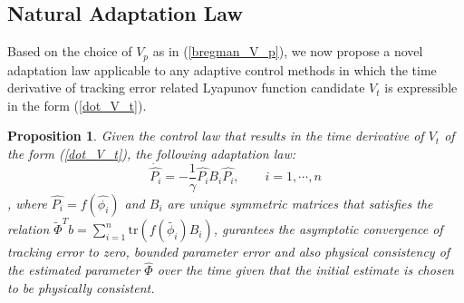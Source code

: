 \documentclass[letterpaper, 10 pt, conference]{ieeeconf}  %
\newtheorem{proposition}{Proposition}
\begin{document}
\subsection{Natural Adaptation Law}
Based on the choice of $V_{p}$ as in (\ref{bregman_V_p}), we now propose a novel adaptation law applicable to any adaptive control methods in which the time derivative of tracking error related Lyapunov function candidate $V_{t}$ is expressible in the form (\ref{dot_V_t}).
\begin{proposition}
Given the control law that results in the time derivative of $V_{t}$ of the form (\ref{dot_V_t}), the following adaptation law:
\begin{equation}
\dot{\hat{P_i}} = -\frac{1}{\gamma}\hat{P_i} B_i \hat{P_i}, \qquad i = 1, \cdots, n \label{natural_adaptation_1}
\end{equation}
, where $\hat{P_i} = f(\hat{\phi_i})$ and $B_i$ are unique symmetric matrices that satisfies the relation $\tilde{\Phi}^{T}b = \sum_{i=1}^n \mathrm{tr}(f(\tilde{\phi_i})B_i)$, gurantees the asymptotic convergence of tracking error to zero, bounded parameter error and also physical consistency of the estimated parameter $\hat{\Phi}$ over the time given that the initial estimate is chosen to be physically consistent.


\end{proposition}
\end{document}
